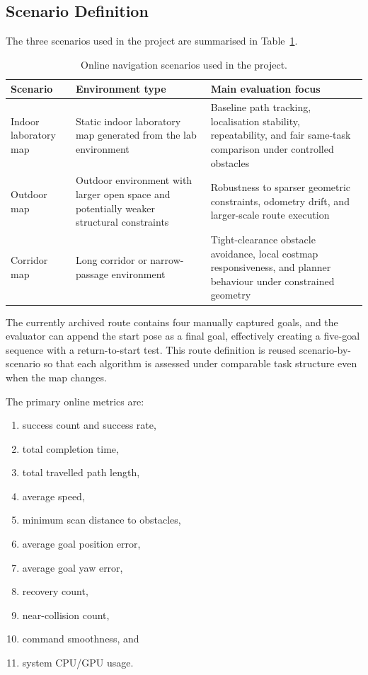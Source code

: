 \documentclass[12pt,a4paper]{report}
\begin{document}
\subsection{Scenario Definition}
The three scenarios used in the project are summarised in Table~\ref{tab:scenarios}.

\begin{table}[H]
\centering
\caption{Online navigation scenarios used in the project.}
\label{tab:scenarios}
\begin{tabular}{p{3cm}p{4cm}p{7cm}}
\toprule
Scenario & Environment type & Main evaluation focus \\
\midrule
Indoor laboratory map & Static indoor laboratory map generated from the lab environment & Baseline path tracking, localisation stability, repeatability, and fair same-task comparison under controlled obstacles \\
Outdoor map & Outdoor environment with larger open space and potentially weaker structural constraints & Robustness to sparser geometric constraints, odometry drift, and larger-scale route execution \\
Corridor map & Long corridor or narrow-passage environment & Tight-clearance obstacle avoidance, local costmap responsiveness, and planner behaviour under constrained geometry \\
\bottomrule
\end{tabular}
\end{table}

The currently archived route contains four manually captured goals, and the evaluator can append the start pose as a final goal, effectively creating a five-goal sequence with a return-to-start test. This route definition is reused scenario-by-scenario so that each algorithm is assessed under comparable task structure even when the map changes.

The primary online metrics are:
\begin{enumerate}[leftmargin=2em]
    \item success count and success rate,
    \item total completion time,
    \item total travelled path length,
    \item average speed,
    \item minimum scan distance to obstacles,
    \item average goal position error,
    \item average goal yaw error,
    \item recovery count,
    \item near-collision count,
    \item command smoothness, and
    \item system CPU/GPU usage.
\end{enumerate}
\end{document}
